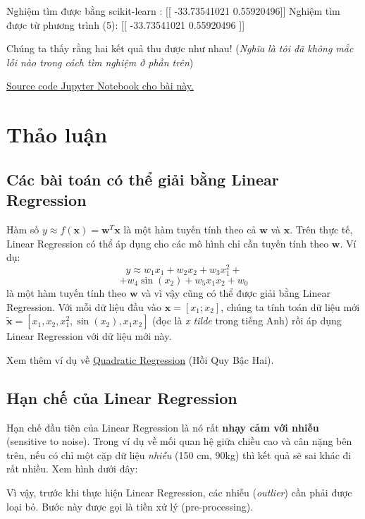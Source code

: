     Nghiệm tìm được bằng scikit-learn  :  [[  -33.73541021 0.55920496]] 
    Nghiệm tìm được từ phương trình (5):  [[  -33.73541021 0.55920496 ]] 
 
 
Chúng ta thấy rằng hai kết quả thu được như nhau! (\textit{Nghĩa là tôi đã không mắc lỗi nào trong cách tìm nghiệm ở phần trên}) 
 
\href{https://github.com/tiepvupsu/tiepvupsu.github.io/blob/master/assets/LR/LR.ipynb}{Source code Jupyter Notebook cho bài này.} 
 
 
 
\section{Thảo luận}
 
 
\subsection{Các bài toán có thể giải bằng Linear Regression}
Hàm số $y \approx f(\mathbf{x})= \mathbf{w}^T\mathbf{x}$ là một hàm tuyến tính theo cả $ \mathbf{w}$ và $\mathbf{x}$. Trên thực tế, Linear Regression có thể áp dụng cho các mô hình chỉ cần tuyến tính theo $\mathbf{w}$. Ví dụ: 
$$ 
y \approx w_1 x_1 + w_2 x_2 + w_3 x_1^2 +  
$$ 
$$ 
+w_4 \sin(x_2) + w_5 x_1x_2 + w_0 
$$ 
là một hàm tuyến tính theo $\mathbf{w}$ và vì vậy cũng có thể được giải bằng Linear Regression. Với mỗi dữ liệu đầu vào $\mathbf{x}=[x_1; x_2] $, chúng ta tính toán dữ liệu mới $\tilde{\mathbf{x}} = [x_1, x_2, x_1^2, \sin(x_2), x_1x_2]$ (đọc là \textit{x tilde} trong tiếng Anh) rồi áp dụng Linear Regression với dữ liệu mới này.  
 
Xem thêm ví dụ về \href{http://www.varsitytutors.com/hotmath/hotmath_help/topics/quadratic-regression}{Quadratic Regression} (Hồi Quy Bậc Hai). 

 
 
\subsection{Hạn chế của Linear Regression}
 
Hạn chế đầu tiên của Linear Regression là nó rất \textbf{nhạy cảm với nhiễu} (sensitive to noise). Trong ví dụ về mối quan hệ giữa chiều cao và cân nặng bên trên, nếu có chỉ 
một cặp dữ liệu \textit{nhiễu} (150 cm, 90kg) thì kết quả sẽ sai khác đi rất nhiều. Xem hình dưới đây: 

Vì vậy, trước khi thực hiện Linear Regression, các nhiễu (\textit{outlier}) cần 
 phải được loại bỏ. Bước này được gọi là tiền xử lý (pre-processing). 
 
